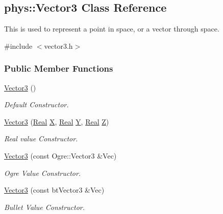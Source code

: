 \hypertarget{classphys_1_1Vector3}{
\subsection{phys::Vector3 Class Reference}
\label{classphys_1_1Vector3}
}


This is used to represent a point in space, or a vector through space.  




{\ttfamily \#include $<$vector3.h$>$}

\subsubsection*{Public Member Functions}
\begin{DoxyCompactItemize}
\item 
\hyperlink{classphys_1_1Vector3_af328c400a03fdb8d2a99fd58382d61cb}{Vector3} ()
\begin{DoxyCompactList}\small\item\em Default Constructor. \item\end{DoxyCompactList}\item 
\hyperlink{classphys_1_1Vector3_af1d323b44d7b6ee3d0a79a196d9967da}{Vector3} (\hyperlink{namespacephys_af7eb897198d265b8e868f45240230d5f}{Real} \hyperlink{classphys_1_1Vector3_a23660f9d1e21a25c53aa06aa737bb56b}{X}, \hyperlink{namespacephys_af7eb897198d265b8e868f45240230d5f}{Real} \hyperlink{classphys_1_1Vector3_a6c9bc2ab0995d5056dba8272c650e58e}{Y}, \hyperlink{namespacephys_af7eb897198d265b8e868f45240230d5f}{Real} \hyperlink{classphys_1_1Vector3_a53c84fa4b38fb9c4a4d822b04c200b13}{Z})
\begin{DoxyCompactList}\small\item\em Real value Constructor. \item\end{DoxyCompactList}\item 
\hyperlink{classphys_1_1Vector3_ac08281de8f4929593b6f4469646691da}{Vector3} (const Ogre::Vector3 \&Vec)
\begin{DoxyCompactList}\small\item\em Ogre Value Constructor. \item\end{DoxyCompactList}\item 
\hyperlink{classphys_1_1Vector3_ac13a263c5e2f84578884183cee890570}{Vector3} (const btVector3 \&Vec)
\begin{DoxyCompactList}\small\item\em Bullet Value Constructor. \item\end{DoxyCompactList}\item 

\end{DoxyCompactItemize}
